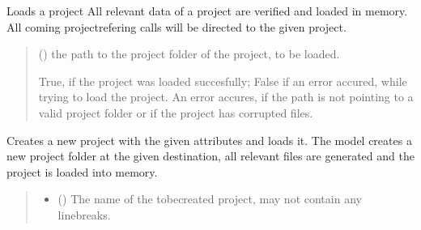 \documentclass[letterpaper,10pt,english]{sphinxmanual}
\begin{document}
\begin{fulllineitems}
\begin{fulllineitems}
\label{\detokenize{apidoc/src.osm_configurator.control:src.osm_configurator.control.control_interface.IControl.load_project}}
\pysigstartsignatures
{}
\pysigstopsignatures
\sphinxAtStartPar
Loads a project
All relevant data of a project are verified and loaded in memory. All coming project\sphinxhyphen{}refering calls will be directed to the given project.
\begin{quote}\begin{description}
\sphinxAtStartPar
{} () \textendash{} the path to the project folder of the project, to be loaded.

\sphinxAtStartPar
True, if the project was loaded succesfully; False if an error accured, while trying to load the project. An error accures, if the path is not pointing to a valid project folder or if the project has corrupted files.

\sphinxAtStartPar
{}

\end{description}\end{quote}

\end{fulllineitems}


\begin{fulllineitems}
\label{\detokenize{apidoc/src.osm_configurator.control:src.osm_configurator.control.control_interface.IControl.create_project}}
\pysigstartsignatures
{}
\pysigstopsignatures
\sphinxAtStartPar
Creates a new project with the given attributes and loads it.
The model creates a new project folder at the given destination, all relevant files are generated and the project is loaded into memory.
\begin{quote}\begin{description}
\begin{itemize}
\item {} 
\sphinxAtStartPar
{} () \textendash{} The name of the to\sphinxhyphen{}be\sphinxhyphen{}created project, may not contain any line\sphinxhyphen{}breaks.


\end{itemize}
\end{description}
\end{quote}
\end{fulllineitems}
\end{fulllineitems}
\end{document}
